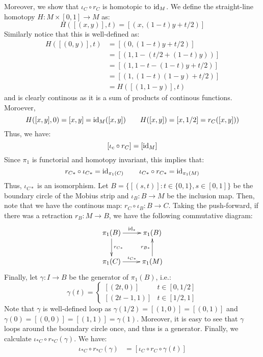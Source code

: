 \documentclass[12pt]{article}
\begin{document}
\begin{solution}
\begin{enumerate}
        Moreover, we show that $\iota_C \circ r_C$ is homotopic to $\operatorname{id}_M$. We define the straight-line homotopy $H: M \times [0, 1] \to M$ as:
        \[H([(x, y)], t) = [(x, (1-t)y + t/2)]\]
        Similarly notice that this is well-defined as:
        \begin{align*}
            H([(0, y)], t) &= [(0, (1-t)y + t/2)] \\
            &= [(1, 1-(t/2+(1-t)y))] \\
            &= [(1, 1-t -(1-t)y + t/2)] \\
            &= [(1, (1-t)(1-y) + t/2)] \\
            &= H([(1, 1-y)], t)
        \end{align*}
        and is clearly continous as it is a sum of products of continous functions. Moroever, 
        \[H([x,y], 0) = [x,y] = \operatorname{id}_M([x,y]) \qquad H([x,y]) = [x,1/2] = r_C([x,y]))\] 
        Thus, we have: 
        \[[\iota_c \circ r_C] = [\operatorname{id}_M]\]
        Since $\pi_1$ is functorial and homotopy invariant, this implies that:
        \[ r_{C*} \circ \iota_{C*} = \operatorname{id}_{\pi_1(C)} \qquad \iota_{C*} \circ r_{C*} = \operatorname{id}_{\pi_1(M)}\]
        Thus, $\iota_{C*}$ is an isomorphism. \bbni 
        Let $B = \{[(s, t)]: t \in \{0, 1\} , s \in [0, 1]\}$ be the boundary circle of the Mobius strip and $\iota_B: B \to M$ be the inclusion map. Then, note that we have the continous map: $r_C \circ \iota_B: B \to C$. Taking the push-forward, if there was a retraction $r_B: M \to B$, we have the following commutative diagram: 
        \[ \xymatrix{ \pi_1(B) \ar[r]^{\id_*} \ar[d]^{r_{C*}} & \pi_1(B)\\ 
        \pi_1(C) \ar[r]^{\iota_{C*}} & \pi_1(M) \ar[u]^{r_{B*}}} \]   
        Finally, let $\gamma: I \to B$ be the generator of $\pi_1(B)$, i.e.:
        \[\gamma(t) = \begin{cases}
            [(2t, 0)] & t \in [0, 1/2] \\
            [(2t-1, 1)] & t \in [1/2, 1]
        \end{cases}\]  
        Note that $\gamma$ is well-defined loop as $\gamma(1/2) = [(1, 0)] = [(0, 1)]$ and $\gamma(0) = [(0, 0)] = [(1, 1)] = \gamma(1)$. Moreover, it is easy to see that $\gamma$ loops around the boundary circle once, and thus is a generator. \bbni 
        Finally, we calculate $\iota_{*C} \circ r_{*C}(\gamma)$. We have:
        \begin{align*}
            \iota_{*C} \circ r_{*C}(\gamma) &= [\iota_C \circ r_C \circ \gamma(t)] \\

\end{align*}
\end{enumerate}
\end{solution}
\end{document}
